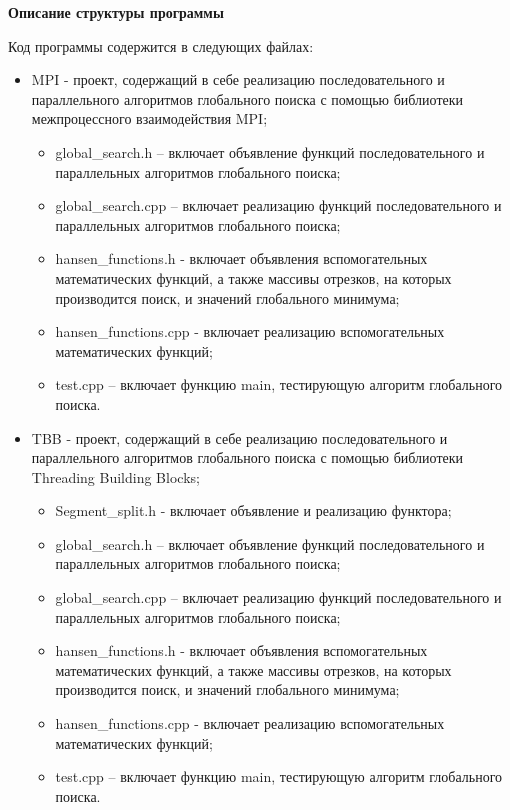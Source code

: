 \documentclass{report}
\begin{document}
\textbf{Описание структуры программы}

Код программы содержится в следующих файлах:
\begin{itemize}
  \item MPI - проект, содержащий в себе реализацию последовательного и параллельного алгоритмов глобального поиска с помощью библиотеки межпроцессного взаимодействия MPI;
    \begin{itemize}
      \item global\_search.h – включает объявление функций последовательного и параллельных алгоритмов глобального поиска;
      \item global\_search.cpp – включает реализацию функций последовательного и параллельных алгоритмов глобального поиска;
      \item hansen\_functions.h - включает объявления вспомогательных математических функций, а также массивы отрезков, на которых производится поиск, и значений глобального минимума;
      \item hansen\_functions.cpp - включает реализацию вспомогательных математических функций;
      \item test.cpp – включает функцию main, тестирующую алгоритм глобального поиска.
    \end{itemize}
  \item TBB - проект, содержащий в себе реализацию последовательного и параллельного алгоритмов глобального поиска с помощью библиотеки Threading Building Blocks;
    \begin{itemize}
      \item Segment\_split.h - включает объявление и реализацию функтора;
      \item global\_search.h – включает объявление функций последовательного и параллельных алгоритмов глобального поиска;
      \item global\_search.cpp – включает реализацию функций последовательного и параллельных алгоритмов глобального поиска;
      \item hansen\_functions.h - включает объявления вспомогательных математических функций, а также массивы отрезков, на которых производится поиск, и значений глобального минимума;
      \item hansen\_functions.cpp - включает реализацию вспомогательных математических функций;
      \item test.cpp – включает функцию main, тестирующую алгоритм глобального поиска.
    \end{itemize}
\end{itemize}
\end{document}
